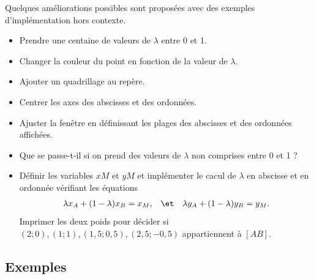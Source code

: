 Quelques améliorations possibles sont proposées avec des exemples d'implémentation hors contexte.
\begin{multicols}{2}
	\begin{itemize}[itemsep=9pt]
		\item Prendre une centaine de valeurs de $\lambda$ entre 0 et 1.
		\item Changer la couleur du point en fonction de la valeur de $\lambda$.
		\item Ajouter un quadrillage au repère.
		\item Centrer les axes des abscisses et des ordonnées.
		\item Ajuster la fenêtre en définissant les plages des abscisses et des ordonnées affichées.
		\item Que se passe-t-il si on prend des valeurs de $\lambda$ non comprises entre 0 et 1 ?
		\item Définir les variables $xM$ et $yM$ et implémenter le cacul de $\lambda$ en abscisse et en ordonnée vérifiant les équations
			\begin{align*}
				\lambda x_A + (1-\lambda) x_B = x_M, && \et && \lambda y_A + (1-\lambda) y_B = y_M.
			\end{align*}
		Imprimer les deux poids pour décider si $(2 ; 0), (1 ; 1), ( 1,5 ; 0,5), (2,5 ; -0,5)$ appartiennent à $[AB]$.
	\end{itemize}
	\vfill\null
	
	\columnbreak
	\centering
	\begin{minipage}{.3\textwidth}
	\end{minipage}
\end{multicols}


\newpage
{}

\subsection*{Exemples}

